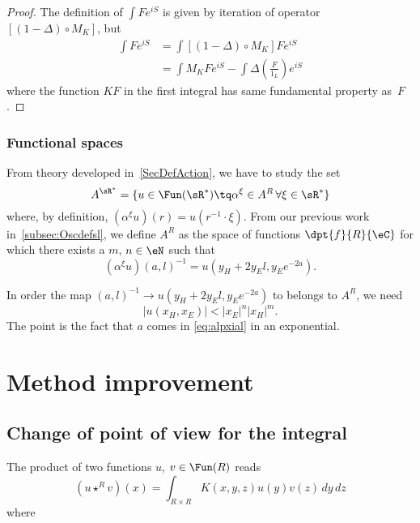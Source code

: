 \begin{proof}
	The definition of $\int F e^{iS}$ is given by iteration of operator $[(1-\Delta)\circ M_K]$, but
	\begin{equation}
		\begin{split}
			\int F e^{iS}&=\int [(1-\Delta)\circ M_K]F e^{iS}\\
			&=\int M_KF e^{iS}-\int \Delta\left( \frac{F}{1_L} \right) e^{iS}
		\end{split}
	\end{equation}
	where the function $KF$ in the first integral has same fundamental property as~$F$.
\end{proof}

\subsubsection{Functional spaces}

From theory developed in~\ref{SecDefAction}, we have to study the set
\[
	A^{\sR^*}=\{ u\in\Fun(\sR^*)\tq \alpha^{\xi}\in A^R\,\forall \xi\in\sR^* \}
\]
where, by definition, $(\alpha^{\xi}u)(r)=u(r^{-1}\cdot\xi)$. From our previous work in~\ref{subsec:Oscdefsl}, we define $A^R$ as the space of functions $\dpt{f}{R}{\eC}$ for which there exists a $m$, $n\in\eN$ such that
\begin{equation}  \label{eq:alpxial}
	(\alpha^{\xi}u)(a,l)^{-1}=u(y_H+2y_El,y_Ee^{-2a}).
\end{equation}

In order the map $(a,l)^{-1}\to u(y_H+2y_El,y_Ee^{-2a})$ to belongs to $A^R$, we need
\begin{equation}
	| u(x_H,x_E) |< | x_E |^n| x_H |^m.
\end{equation}
The point is the fact that $a$ comes in \eqref{eq:alpxial} in an exponential.

\section{Method improvement}

\subsection{Change of point of view for the integral}


The product of two functions $u$, $v\in\Fun(R)$ reads
\begin{equation}
	(u\star^R v)(x)=\int_{R\times R} K(x,y,z)u(y)v(z)\,dy\,dz
\end{equation}
where

